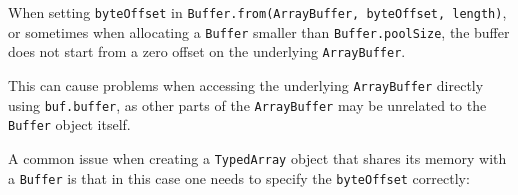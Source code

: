 When setting \texttt{byteOffset} in
\texttt{Buffer.from(ArrayBuffer,\ byteOffset,\ length)}, or sometimes
when allocating a \texttt{Buffer} smaller than \texttt{Buffer.poolSize},
the buffer does not start from a zero offset on the underlying
\texttt{ArrayBuffer}.

This can cause problems when accessing the underlying
\texttt{ArrayBuffer} directly using \texttt{buf.buffer}, as other parts
of the \texttt{ArrayBuffer} may be unrelated to the \texttt{Buffer}
object itself.

A common issue when creating a \texttt{TypedArray} object that shares
its memory with a \texttt{Buffer} is that in this case one needs to
specify the \texttt{byteOffset} correctly:

\begin{Shaded}
\begin{Highlighting}[]
\NormalTok{ \{ }\NormalTok{ \} } \OperatorTok{;}

\OperatorTok{=} \NormalTok{([}\OperatorTok{,} \OperatorTok{,} \OperatorTok{,} \OperatorTok{,} \OperatorTok{,} \OperatorTok{,} \OperatorTok{,} \OperatorTok{,} \OperatorTok{,} \NormalTok{])}\OperatorTok{;}

 \OperatorTok{,}\OperatorTok{,}\NormalTok{)}\OperatorTok{;}
\end{Highlighting}
\end{Shaded}

